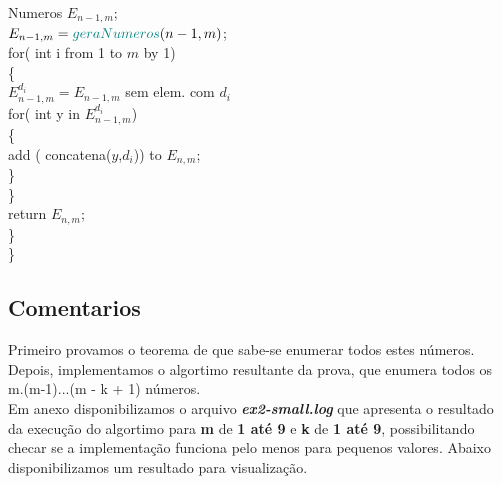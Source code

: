 \documentclass[twoside]{article}
\begin{document}
\begin{multicols}{2}
\hspace*{10mm} {\color[rgb]{0,0,1} Numeros} $E_{n-1,m}$;\\
\hspace*{10mm} $E_{n-1,m} = {\color[rgb]{0,0.5,0.5} geraNumeros}(n-1,m)$;\\
\hspace*{10mm} {\color[rgb]{0.7,0.3,0} for}({\color[rgb]{0,0,1} int} i {\color[rgb]{0.7,0.3,0} from} 1 {\color[rgb]{0.7,0.3,0} to} $m$ {\color[rgb]{0.7,0.3,0} by} 1)\\
\hspace*{10mm} \{\\
\hspace*{15mm} $E_{n-1,m}^{d_i} = E_{n-1,m}$ {\color[rgb]{0,0.5,0.5}sem elem. com} $d_i$\\
\hspace*{15mm} {\color[rgb]{0.7,0.3,0} for}({\color[rgb]{0,0,1} int} y {\color[rgb]{0.7,0.3,0} in} $E_{n-1,m}^{d_i}$)\\
\hspace*{15mm} \{\\
\hspace*{20mm} {\color[rgb]{0,0.5,0.5} add} ({\color[rgb]{0,0.5,0.5} concatena}($y$,$d_i$)) {\color[rgb]{0,0.5,0.5} to} $E_{n,m}$;\\
\hspace*{15mm} \}\\
\hspace*{10mm} \}\\
\hspace*{10mm} {\color[rgb]{0.5,0,1} return}  $E_{n,m}$;\\
\hspace*{5mm} \}\\
\}

\subsection{ Comentarios }
\indent  Primeiro provamos o teorema de que sabe-se enumerar todos estes números. Depois, implementamos o algortimo resultante da prova, que enumera todos os m.(m-1)...(m - k + 1) números.\\

\indent Em anexo disponibilizamos o arquivo \textbf{\textit{ex2-small.log}} que apresenta o resultado da execução do algortimo para \textbf{m} de \textbf{1 até 9} e \textbf{k} de \textbf{1 até 9}, possibilitando checar se a implementação funciona pelo menos para pequenos valores. Abaixo disponibilizamos um resultado para visualização.


\end{multicols}
\end{document}
